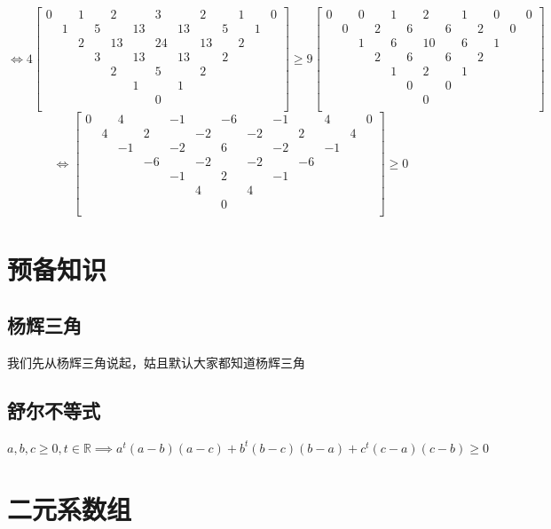 \documentclass[UTF8]{ctexart}
\begin{document}
$$\Leftrightarrow 
4\left[
\begin{smallmatrix}
	0& &1& &2& &3& &2& &1& &0\\
	&1& &5& &13& &13& &5& &1&\\
	& &2& &13& &24& &13& &2& &\\
	& & &3& &13& &13& &2& & &\\
	& & & &2& &5& &2& & & &\\
	& & & & &1& &1& & & & &\\
	& & & & & &0& & & & & &\\
\end{smallmatrix}
\right]\geq 9
\left[
\begin{smallmatrix}
	0& &0& &1& &2& &1& &0& &0\\
	&0& &2& &6& &6& &2& &0&\\
	& &1& &6& &10& &6& &1& &\\
	& & &2& &6& &6& &2& & &\\
	& & & &1& &2& &1& & & &\\
	& & & & &0& &0& & & & &\\
	& & & & & &0& & & & & &\\
\end{smallmatrix}
\right]
$$
$$\Leftrightarrow 
\left[
\begin{smallmatrix}
	0& &4& &-1& &-6& &-1& &4& &0\\
	&4& &2& &-2& &-2& &2& &4&\\
	& &-1& &-2& &6& &-2& &-1& &\\
	& & &-6& &-2& &-2& &-6& & &\\
	& & & &-1& &2& &-1& & & &\\
	& & & & &4& &4& & & & &\\
	& & & & & &0& & & & & &\\
\end{smallmatrix}
\right]\geq 0
$$

\newpage
\tableofcontents

\newpage

\section{预备知识} 
\subsection{杨辉三角}
我们先从杨辉三角说起，姑且默认大家都知道杨辉三角
\subsection{舒尔不等式}
$ a,b,c \geq 0,t\in \mathbb{R}\implies a^{t}(a-b)(a-c)+b^{t}(b-c)(b-a)+c^{t}(c-a)(c-b)\geq 0
 $\section{二元系数组}
\end{document}
